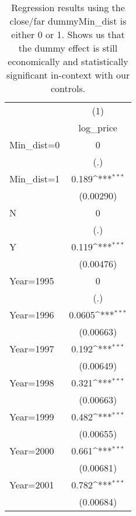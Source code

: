 {
\def\sym#1{\ifmmode^{#1}\else\(^{#1}\)\fi}
\begin{longtable}{l*{1}{c}}
\caption{Regression results using the close/far dummyMin\_dist is either 0 or 1. Shows us that the dummy effect is still economically and statistically significant in-context with our controls.}\\
\toprule\endfirsthead\midrule\endhead\midrule\endfoot\endlastfoot
                    &\multicolumn{1}{c}{(1)}\\
                    &\multicolumn{1}{c}{log\_price}\\
\midrule
Min\_dist=0          &           0         \\
                    &         (.)         \\
\addlinespace
Min\_dist=1          &       0.189\sym{***}\\
                    &   (0.00290)         \\
\addlinespace
N                   &           0         \\
                    &         (.)         \\
\addlinespace
Y                   &       0.119\sym{***}\\
                    &   (0.00476)         \\
\addlinespace
Year=1995           &           0         \\
                    &         (.)         \\
\addlinespace
Year=1996           &      0.0605\sym{***}\\
                    &   (0.00663)         \\
\addlinespace
Year=1997           &       0.192\sym{***}\\
                    &   (0.00649)         \\
\addlinespace
Year=1998           &       0.321\sym{***}\\
                    &   (0.00663)         \\
\addlinespace
Year=1999           &       0.482\sym{***}\\
                    &   (0.00655)         \\
\addlinespace
Year=2000           &       0.661\sym{***}\\
                    &   (0.00681)         \\
\addlinespace
Year=2001           &       0.782\sym{***}\\
                    &   (0.00684)         \\

\end{longtable}}
